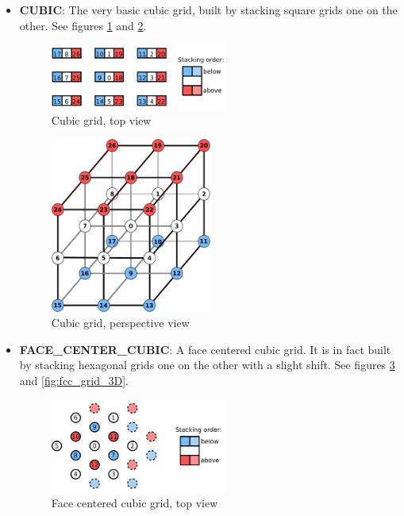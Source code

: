 \documentclass[a4paper,10pt,oneside]{article}
\begin{document}
\begin{itemize}
\item \textbf{CUBIC}: The very basic cubic grid, built by stacking square
grids one on the other. See figures \ref{fig:cubic_grid} and \ref{fig:cubic_grid_3D}.

\begin{figure}
\centering
\includegraphics[width=0.55\textwidth]{figures/cubic_grid.pdf}
\caption{Cubic grid, top view}
\label{fig:cubic_grid}
\end{figure}

\begin{figure}
\centering
\includegraphics[width=0.5\textwidth]{figures/Cubic_grid_3D.pdf}
\caption{Cubic grid, perspective view}
\label{fig:cubic_grid_3D}
\end{figure}

\item \textbf{FACE\_CENTER\_CUBIC}: A face centered cubic grid. It is in fact
built by stacking hexagonal grids one on the other with a slight shift. See
figures \ref{fig:fcc_grid} and \ref{fig:fcc_grid_3D}.

\begin{figure}
\centering
\includegraphics[width=0.55\textwidth]{figures/fcc_grid.pdf}
\caption{Face centered cubic grid, top view}
\label{fig:fcc_grid}
\end{figure}


\end{itemize}
\end{document}
